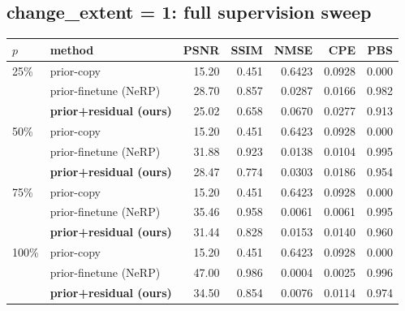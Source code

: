 \documentclass[11pt]{article}
\begin{document}
\subsection*{change\_extent = 1: full supervision sweep}
\begin{table}[H]\centering\begin{tabular}{llrrrrr}\toprule
$p$ & method & PSNR & SSIM & NMSE & CPE & PBS \\ \midrule
25\% & prior-copy & 15.20 & 0.451 & 0.6423 & 0.0928 & 0.000 \\
 & prior-finetune (NeRP) & 28.70 & 0.857 & 0.0287 & 0.0166 & 0.982 \\
 & \textbf{prior+residual (ours)} & 25.02 & 0.658 & 0.0670 & 0.0277 & 0.913 \\
\midrule
50\% & prior-copy & 15.20 & 0.451 & 0.6423 & 0.0928 & 0.000 \\
 & prior-finetune (NeRP) & 31.88 & 0.923 & 0.0138 & 0.0104 & 0.995 \\
 & \textbf{prior+residual (ours)} & 28.47 & 0.774 & 0.0303 & 0.0186 & 0.954 \\
\midrule
75\% & prior-copy & 15.20 & 0.451 & 0.6423 & 0.0928 & 0.000 \\
 & prior-finetune (NeRP) & 35.46 & 0.958 & 0.0061 & 0.0061 & 0.995 \\
 & \textbf{prior+residual (ours)} & 31.44 & 0.828 & 0.0153 & 0.0140 & 0.960 \\
\midrule
100\% & prior-copy & 15.20 & 0.451 & 0.6423 & 0.0928 & 0.000 \\
 & prior-finetune (NeRP) & 47.00 & 0.986 & 0.0004 & 0.0025 & 0.996 \\
 & \textbf{prior+residual (ours)} & 34.50 & 0.854 & 0.0076 & 0.0114 & 0.974 \\

\bottomrule\end{tabular}
\end{table}
\end{document}
